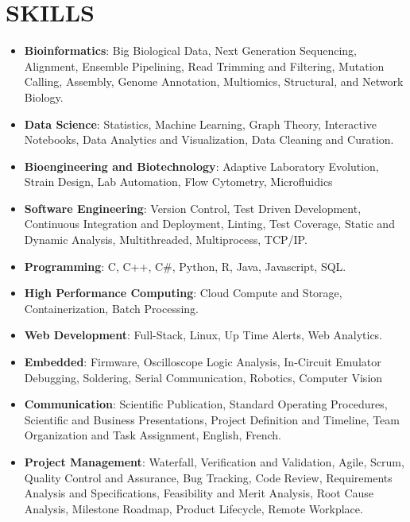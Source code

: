 \documentclass[10pt]{article}
\begin{document}
{{\section*{SKILLS}
\begin{itemize}
\item\textbf{Bioinformatics}: Big Biological Data, Next Generation Sequencing, Alignment, Ensemble Pipelining, Read Trimming and Filtering, Mutation Calling, Assembly, Genome Annotation, Multiomics, Structural, and Network Biology.
\item\textbf{Data Science}: Statistics, Machine Learning, Graph Theory, Interactive Notebooks, Data Analytics and Visualization, Data Cleaning and Curation.
\item\textbf{Bioengineering and Biotechnology}: Adaptive Laboratory Evolution, Strain Design, Lab Automation, Flow Cytometry, Microfluidics
\item\textbf{Software Engineering}: Version Control, Test Driven Development, Continuous Integration and Deployment, Linting, Test Coverage, Static and Dynamic Analysis, Multithreaded, Multiprocess, TCP/IP.
\item\textbf{Programming}: C, C++, C\#, Python, R, Java, Javascript, SQL.
\item\textbf{High Performance Computing}: Cloud Compute and Storage, Containerization, Batch Processing.
\item\textbf{Web Development}: Full-Stack, Linux, Up Time Alerts, Web Analytics.
\item\textbf{Embedded}: Firmware, Oscilloscope Logic Analysis, In-Circuit Emulator Debugging, Soldering, Serial Communication, Robotics, Computer Vision
\item\textbf{Communication}: Scientific Publication, Standard Operating Procedures, Scientific and Business Presentations, Project Definition and Timeline, Team Organization and Task Assignment, English, French.
\item\textbf{Project Management}: Waterfall, Verification and Validation, Agile, Scrum, Quality Control and Assurance, Bug Tracking, Code Review, Requirements Analysis and Specifications, Feasibility and Merit Analysis, Root Cause Analysis, Milestone Roadmap, Product Lifecycle, Remote Workplace.
\end{itemize}

}}
\end{document}
